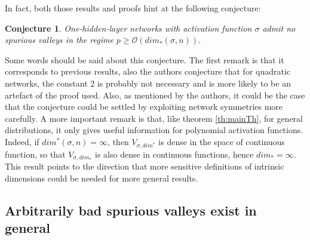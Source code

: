 \documentclass[11pt]{article} %
\newtheorem{conjecture}{Conjecture}[section]
\begin{document}
\par
In fact, both those results and proofs hint at the following conjecture:
\begin{conjecture}\label{th:conj}
	One-hidden-layer networks with activation function $\sigma$ admit no spurious valleys in the regime $p\geq \mathcal{O}(dim_*(\sigma, n))$.
\end{conjecture}
Some words should be said about this conjecture. 
The first remark is that it corresponds to previous results, also the authors conjecture that for quadratic networks, the constant 2 is probably not necessary and is more likely to be an artefact of the proof used. Also, as mentioned by the authors, it could be the case that the conjecture could be settled by exploiting network symmetries more carefully.
\newline
A more important remark is that, like theorem \ref{th:mainTh}, for general distributions, it only gives useful information for polynomial activation functions.
Indeed, if $dim^*(\sigma, n) = \infty$, then $V_{\sigma, dim^*}$ is dense in the space of continuous function, so that $V_{\sigma, dim_*}$ is also dense in continuous functions, hence $dim_* = \infty$. This result points to the direction that more sensitive definitions of intrinsic dimensions could be needed for more general results.

\subsection{Arbitrarily bad spurious valleys exist in general}
\end{document}

